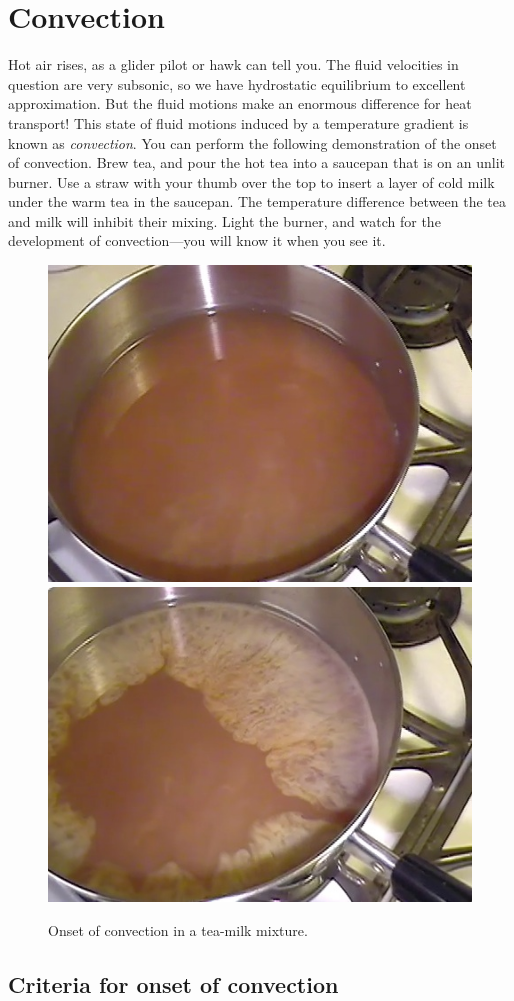 \chapter{Convection}\label{s.convection}

Hot air rises, as a glider pilot or hawk can tell you. The fluid velocities in question are very subsonic, so we have hydrostatic equilibrium to excellent approximation. But the fluid motions make an enormous difference for heat transport! This state of fluid motions induced by a temperature gradient is known as \emph{convection}. You can perform the following demonstration of the onset of convection.  Brew tea, and pour the hot tea into a saucepan that is on an unlit burner.  Use a straw with your thumb over the top to insert a layer of cold milk under the warm tea in the saucepan.  The temperature difference between the tea and milk will inhibit their mixing. Light the burner, and watch for the development of convection---you will know it when you see it.

\begin{figure}[htbp]
\includegraphics[width=0.5\linewidth]{convection-1}\includegraphics[width=0.5\linewidth]{convection-2}
\caption{Onset of convection in a tea-milk mixture.\label{f.tea}}
\end{figure}

\section{Criteria for onset of convection}\label{s.convection-onset}

